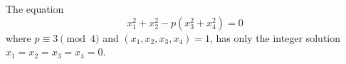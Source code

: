 \begin{proposition}
    The equation
\[
    x_1^2+x_2^2-p(x_3^2+x_4^2)=0
\]
    where $p\equiv3\pmod4$ and $(x_1,x_2,x_3,x_4)=1$, has only the integer solution $x_1=x_2=x_3=x_4=0$.
\end{proposition}
